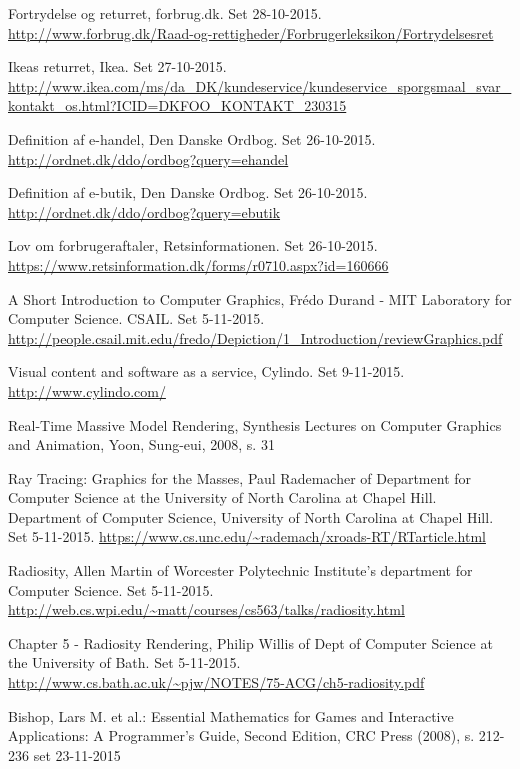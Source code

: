 \begin{thebibliography}{99}
  Fortrydelse og returret,
  forbrug.dk.
  Set 28-10-2015.
  \url{http://www.forbrug.dk/Raad-og-rettigheder/Forbrugerleksikon/Fortrydelsesret}

  Ikeas returret,
  Ikea.
  Set 27-10-2015.
  \url{http://www.ikea.com/ms/da_DK/kundeservice/kundeservice_sporgsmaal_svar_kontakt_os.html?ICID=DKFOO_KONTAKT_230315}
  
  Definition af e-handel,
  Den Danske Ordbog.
  Set 26-10-2015.
  \url{http://ordnet.dk/ddo/ordbog?query=ehandel}

  Definition af e-butik,
  Den Danske Ordbog.
  Set 26-10-2015. 
  \url{http://ordnet.dk/ddo/ordbog?query=ebutik}

  Lov om forbrugeraftaler,
  Retsinformationen.
  Set 26-10-2015.
  \url{https://www.retsinformation.dk/forms/r0710.aspx?id=160666}

  A Short Introduction to Computer Graphics,
  Frédo Durand - MIT Laboratory for Computer Science.
  CSAIL.
  Set 5-11-2015.
  \url{http://people.csail.mit.edu/fredo/Depiction/1_Introduction/reviewGraphics.pdf}
  
  Visual content and software as a service,
  Cylindo.
  Set 9-11-2015.
  \url{http://www.cylindo.com/}
  
  Real-Time Massive Model Rendering,
  Synthesis Lectures on Computer Graphics and Animation,
  Yoon, Sung-eui, 2008,
  s. 31

  Ray Tracing: Graphics for the Masses, 
  Paul Rademacher of Department for Computer Science at 	  the University of North Carolina at Chapel Hill.
  Department of Computer Science, University of North Carolina at Chapel Hill.
  Set 5-11-2015.
  \url{https://www.cs.unc.edu/~rademach/xroads-RT/RTarticle.html}

  Radiosity,
  Allen Martin of Worcester Polytechnic Institute's department for Computer Science.
  Set 5-11-2015.
  \url{http://web.cs.wpi.edu/~matt/courses/cs563/talks/radiosity.html}

  Chapter 5 - Radiosity Rendering,
  Philip Willis of Dept of Computer Science at the University of Bath.
  Set 5-11-2015.
  \url{http://www.cs.bath.ac.uk/~pjw/NOTES/75-ACG/ch5-radiosity.pdf}
  
  Bishop, Lars M. et al.: Essential Mathematics for Games and Interactive Applications:
  A Programmer’s Guide, Second Edition, CRC Press (2008), s. 212-236
  set 23-11-2015
  

\end{thebibliography}
